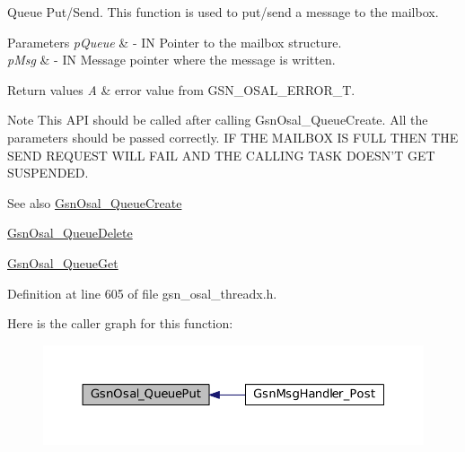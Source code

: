 Queue Put/Send. This function is used to put/send a message to the mailbox. 


\begin{DoxyParams}{Parameters}
{\em pQueue} & -\/ IN Pointer to the mailbox structure. \\
\hline
{\em pMsg} & -\/ IN Message pointer where the message is written. \\
\hline
\end{DoxyParams}

\begin{DoxyRetVals}{Return values}
{\em A} & error value from GSN\_\-OSAL\_\-ERROR\_\-T. \\
\hline
\end{DoxyRetVals}
\begin{DoxyNote}{Note}
This API should be called after calling GsnOsal\_\-QueueCreate. All the parameters should be passed correctly. IF THE MAILBOX IS FULL THEN THE SEND REQUEST WILL FAIL AND THE CALLING TASK DOESN'T GET SUSPENDED. 
\end{DoxyNote}
\begin{DoxySeeAlso}{See also}
\hyperlink{a00628_gad7990e4a518c71f9d9a611b9ee379b9a}{GsnOsal\_\-QueueCreate} 

\hyperlink{a00628_ga52ee4c5716ea5f675b1b11b79dd2c130}{GsnOsal\_\-QueueDelete} 

\hyperlink{a00628_ga4db12c3f53ae65618056f1ebab33f1b5}{GsnOsal\_\-QueueGet} 
\end{DoxySeeAlso}


Definition at line 605 of file gsn\_\-osal\_\-threadx.h.



Here is the caller graph for this function:
\nopagebreak
\begin{figure}[H]
\begin{center}
\leavevmode
\includegraphics[width=388pt]{a00628_ga67adc0a9e709aabc4e9e4c8ff0241e81_icgraph}
\end{center}
\end{figure}


